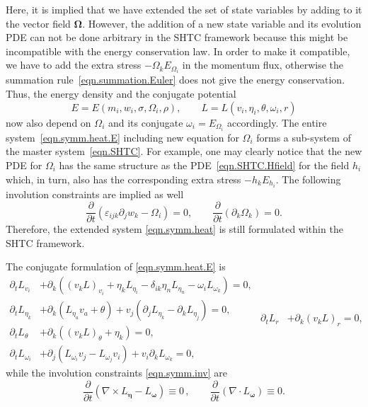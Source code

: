 \documentclass[twoside]{article}
\newcommand{\ted}{E} %
\newcommand{\pd}{\partial}
\begin{document}
Here, it is implied that we have extended the set of state variables by adding 
to it the vector field $ \bm{\Omega} $. However, the addition of a new state 
variable and its evolution PDE can not be done 
arbitrary in the SHTC framework because this might be incompatible with the 
energy conservation law. In order to make it compatible, we have to add the 
extra stress $-\Omega _k E_{\Omega_i} $ in the momentum flux, otherwise the 
summation rule~\eqref{eqn.summation.Euler} does not give the energy 
conservation. Thus, the energy density and the 
conjugate potential
\begin{equation}
\ted = \ted(m_i,w_i,\sigma,\Omega_i,\rho), \qquad L= L 
(v_i,\eta_i,\theta,\omega_i,r)
\end{equation}
now also depend on $ \Omega_i $ and its conjugate $ \omega_i = 
\ted_{\Omega_i} $ accordingly. 
The entire system~\eqref{eqn.symm.heat.E} including new equation for $ \Omega_i 
$ forms a 
sub-system of the master 
system~\eqref{eqn.SHTC}.  For example, one may clearly notice that the new PDE 
for $ 
\Omega_i 
$ has the same structure as the PDE~\eqref{eqn.SHTC.Hfield} for the field $ h_i 
$ which, in turn, also has the corresponding extra stress $ -h_k \ted_{h_i} $. 
The following involution constraints are implied as well 
\begin{equation}\label{eqn.symm.inv}
\frac{\pd}{\pd t}\left(\varepsilon_{ijk}\pd_j w_k - \Omega_i\right) = 0, \qquad
\frac{\pd}{\pd t} \left(\pd_k \Omega_k \right) = 0.
\end{equation}
Therefore, the extended system 
\eqref{eqn.symm.heat} is still formulated within the SHTC framework.

The conjugate formulation of \eqref{eqn.symm.heat.E} is
\begin{subequations}\label{eqn.symm.heat}
	\begin{align}
\pd_t L_{v_i} & + \pd _k \left ((v_k L)_{v_i} + \eta_{k}L_{\eta_i} - 
\delta_{ik}\eta_n 
L_{\eta_n} - \omega _iL_{\omega _k}\right ) = 0,\\[1mm]
\pd_t L_{\eta _k} & +\pd _k (L_{\eta _a}v_a + \theta ) + v_j (\pd_j	L_{\eta_k} 
- \pd_k L_{\eta_j} )= 0,\\[1mm]
\pd_t L_{\theta } & +\pd _k((v_k L)_{\theta } + \eta_k)=0,\\[1mm]
\pd_t L_{\omega _i} & +\pd _j(L_{\omega _i}v_j-L_{\omega 
_j}v_i) + v_i \pd_k L_{\omega_k} = 0, %
	\end{align}
	\begin{align}
\pd_t L_r & +\pd _k \left(v_kL\right)_r=0,
	\end{align}
\end{subequations}
while the involution constraints \eqref{eqn.symm.inv} are
\begin{equation}\label{eqn.symm.heat.constr}
\frac{\pd }{\pd t}\left ( \nabla\times L_{\bm{\eta}} - L_{\bm{\omega}} \right ) 
\equiv 0\,, 
\qquad \frac{\pd}{\pd t} \left(\nabla\cdot L_{\bm{\omega}} \right) \equiv 0.
\end{equation}
\end{document}
